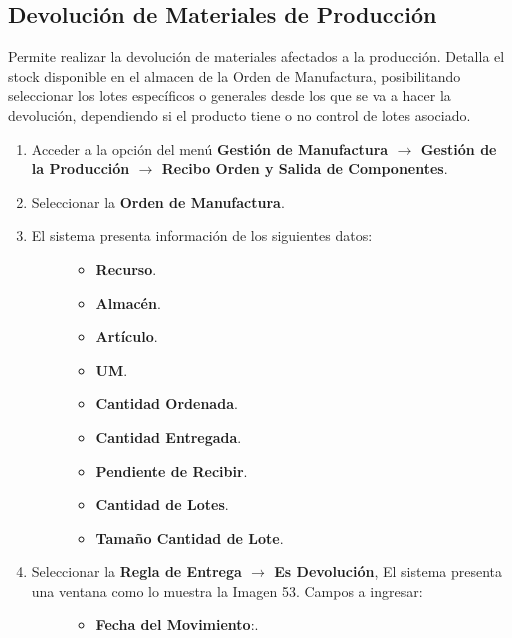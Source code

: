 \documentclass[letterpaper,10pt,spanish]{sphinxmanual}
\begin{document}
\subsection{Devolución de Materiales de Producción}
\label{manufactura-operaciones:devolucion-de-materiales-de-produccion}
Permite realizar la devolución de materiales afectados a la producción. Detalla el stock disponible en el almacen de la Orden de Manufactura, posibilitando seleccionar los lotes específicos o generales desde los que se va a hacer la devolución, dependiendo si el producto tiene o no control de lotes asociado.
\begin{enumerate}
\item {} 
Acceder a la opción del menú \textbf{Gestión de Manufactura \(\rightarrow\) Gestión de la Producción \(\rightarrow\) Recibo Orden y Salida de Componentes}.

\item {} 
Seleccionar la \textbf{Orden de Manufactura}.

\item {} \begin{description}
\item[{El sistema presenta información de los siguientes datos:}] \leavevmode\begin{itemize}
\item {} 
\textbf{Recurso}.

\item {} 
\textbf{Almacén}.

\item {} 
\textbf{Artículo}.

\item {} 
\textbf{UM}.

\item {} 
\textbf{Cantidad Ordenada}.

\item {} 
\textbf{Cantidad Entregada}.

\item {} 
\textbf{Pendiente de Recibir}.

\item {} 
\textbf{Cantidad de Lotes}.

\item {} 
\textbf{Tamaño Cantidad de Lote}.

\end{itemize}

\end{description}

\item {} \begin{description}
\item[{Seleccionar la \textbf{Regla de Entrega \(\rightarrow\) Es Devolución}, El sistema presenta una ventana como lo muestra la Imagen 53. Campos a ingresar:}] \leavevmode\begin{itemize}
\item {} 
\textbf{Fecha del Movimiento}:.


\end{itemize}
\end{description}
\end{enumerate}
\end{document}
